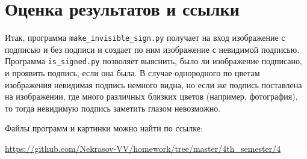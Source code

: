 \documentclass[12pt,a4paper]{scrartcl}
\begin{document}
\section{Оценка результатов и ссылки}
Итак, программа \texttt{make\_invisible\_sign.py} получает на вход изображение с подписью и без подписи и создает по ним изображение с невидимой подписью. Программа \texttt{is\_signed.py} позволяет выяснить, было ли изображение подписано, и проявить подпись, если она была. В случае однородного по цветам изображения невидимая подпись немного видна, но если же подпись поставлена на изображении, где много различных близких цветов (например, фотография), то тогда невидимую подпись заметить глазом невозможно.

Файлы программ и картинки можно найти по ссылке: 

\href{https://github.com/Nekrasov-VV/homework/tree/master/4th\_semester/4}{https://github.com/Nekrasov-VV/homework/tree/master/4th\_semester/4}
\end{document}

